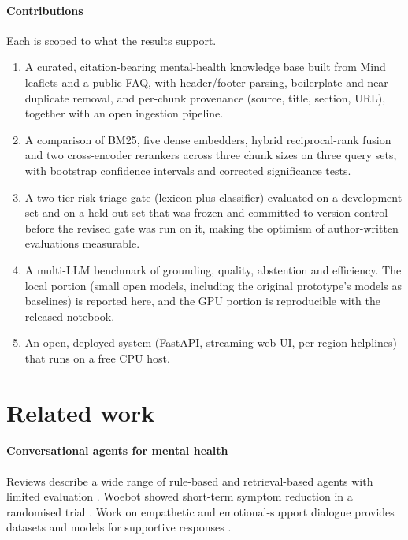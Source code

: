 \documentclass[preprint,12pt,authoryear]{elsarticle}
\begin{document}
\paragraph{Contributions}
Each is scoped to what the results support.
\begin{enumerate}[leftmargin=*]
\item A curated, citation-bearing mental-health knowledge base built from Mind leaflets and a public FAQ, with
      header/footer parsing, boilerplate and near-duplicate removal, and per-chunk provenance (source, title, section,
      URL), together with an open ingestion pipeline.
\item A comparison of BM25, five dense embedders, hybrid reciprocal-rank fusion and two cross-encoder rerankers across
      three chunk sizes on three query sets, with bootstrap confidence intervals and corrected significance tests.
\item A two-tier risk-triage gate (lexicon plus classifier) evaluated on a development set and on a held-out set that was
      frozen and committed to version control before the revised gate was run on it, making the optimism of
      author-written evaluations measurable.
\item A multi-LLM benchmark of grounding, quality, abstention and efficiency. The local portion (small open models,
      including the original prototype's models as baselines) is reported here, and the GPU portion is reproducible with
      the released notebook.
\item An open, deployed system (FastAPI, streaming web UI, per-region helplines) that runs on a free CPU host.
\end{enumerate}

\section{Related work}
\paragraph{Conversational agents for mental health} Reviews describe a wide range of rule-based and retrieval-based
agents with limited evaluation \citep{vaidyam2019chatbots,abdalrazaq2019overview}. Woebot showed short-term symptom
reduction in a randomised trial \citep{fitzpatrick2017woebot}. Work on empathetic and emotional-support dialogue
provides datasets and models for supportive responses \citep{sharma2020empathy,liu2021esconv}.
\end{document}
